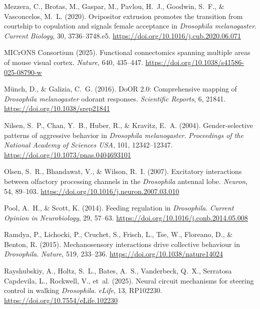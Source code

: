 Mezzera, C., Brotas, M., Gaspar, M., Pavlou, H.~J., Goodwin, S.~F., \& Vasconcelos, M.~L. (2020). Ovipositor extrusion promotes the transition from courtship to copulation and signals female acceptance in \emph{Drosophila melanogaster}. \emph{Current Biology}, 30, 3736--3748.e5. \url{https://doi.org/10.1016/j.cub.2020.06.071}

MICrONS Consortium (2025). Functional connectomics spanning multiple areas of mouse visual cortex. \emph{Nature}, 640, 435--447. \url{https://doi.org/10.1038/s41586-025-08790-w}

M\"{u}nch, D., \& Galizia, C.~G. (2016). DoOR 2.0: Comprehensive mapping of \emph{Drosophila melanogaster} odorant responses. \emph{Scientific Reports}, 6, 21841. \url{https://doi.org/10.1038/srep21841}

Nilsen, S.~P., Chan, Y.~B., Huber, R., \& Kravitz, E.~A. (2004). Gender-selective patterns of aggressive behavior in \emph{Drosophila melanogaster}. \emph{Proceedings of the National Academy of Sciences USA}, 101, 12342--12347. \url{https://doi.org/10.1073/pnas.0404693101}

Olsen, S.~R., Bhandawat, V., \& Wilson, R.~I. (2007). Excitatory interactions between olfactory processing channels in the \emph{Drosophila} antennal lobe. \emph{Neuron}, 54, 89--103. \url{https://doi.org/10.1016/j.neuron.2007.03.010}

Pool, A.~H., \& Scott, K. (2014). Feeding regulation in \emph{Drosophila}. \emph{Current Opinion in Neurobiology}, 29, 57--63. \url{https://doi.org/10.1016/j.conb.2014.05.008}

Ramdya, P., Lichocki, P., Cruchet, S., Frisch, L., Tse, W., Floreano, D., \& Benton, R. (2015). Mechanosensory interactions drive collective behaviour in \emph{Drosophila}. \emph{Nature}, 519, 233--236. \url{https://doi.org/10.1038/nature14024}

Rayshubskiy, A., Holtz, S.~L., Bates, A.~S., Vanderbeck, Q.~X., Serratosa Capdevila, L., Rockwell, V., et~al. (2025). Neural circuit mechanisms for steering control in walking \emph{Drosophila}. \emph{eLife}, 13, RP102230. \url{https://doi.org/10.7554/eLife.102230}

